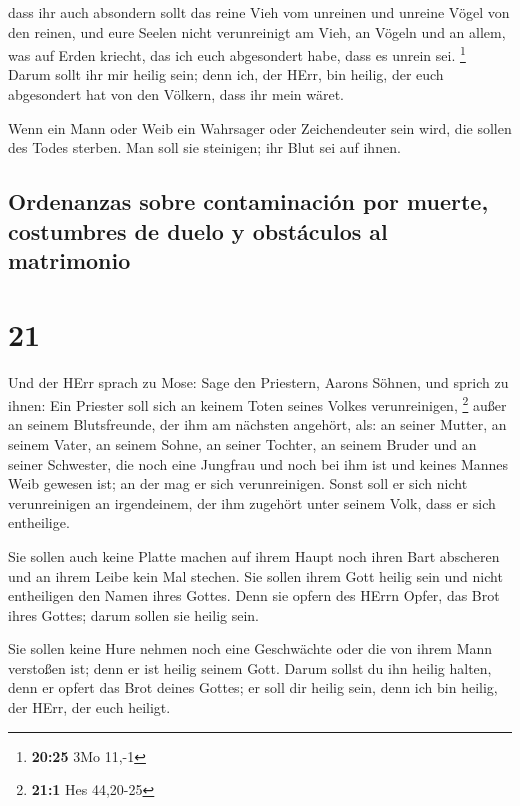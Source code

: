  dass ihr auch absondern sollt das reine Vieh vom
unreinen und unreine Vögel von den reinen, und eure Seelen nicht
verunreinigt am Vieh, an Vögeln und an allem, was auf Erden kriecht, das
ich euch abgesondert habe, dass es unrein sei. \footnote{\textbf{20:25}
  3Mo 11,-1}  Darum sollt ihr mir heilig sein; denn ich,
der HErr, bin heilig, der euch abgesondert hat von den Völkern, dass ihr
mein wäret.

 Wenn ein Mann oder Weib ein Wahrsager oder Zeichendeuter
sein wird, die sollen des Todes sterben. Man soll sie steinigen; ihr
Blut sei auf ihnen.

\hypertarget{ordenanzas-sobre-contaminaciuxf3n-por-muerte-costumbres-de-duelo-y-obstuxe1culos-al-matrimonio}{%
\subsection{Ordenanzas sobre contaminación por muerte, costumbres de
duelo y obstáculos al
matrimonio}\label{ordenanzas-sobre-contaminaciuxf3n-por-muerte-costumbres-de-duelo-y-obstuxe1culos-al-matrimonio}}

\hypertarget{section-20}{%
\section{21}\label{section-20}}

 Und der HErr sprach zu Mose: Sage den Priestern, Aarons
Söhnen, und sprich zu ihnen: Ein Priester soll sich an keinem Toten
seines Volkes verunreinigen, \footnote{\textbf{21:1} Hes 44,20-25}
 außer an seinem Blutsfreunde, der ihm am nächsten
angehört, als: an seiner Mutter, an seinem Vater, an seinem Sohne, an
seiner Tochter, an seinem Bruder  und an seiner Schwester,
die noch eine Jungfrau und noch bei ihm ist und keines Mannes Weib
gewesen ist; an der mag er sich verunreinigen.  Sonst soll
er sich nicht verunreinigen an irgendeinem, der ihm zugehört unter
seinem Volk, dass er sich entheilige.

 Sie sollen auch keine Platte machen auf ihrem Haupt noch
ihren Bart abscheren und an ihrem Leibe kein Mal stechen. 
Sie sollen ihrem Gott heilig sein und nicht entheiligen den Namen ihres
Gottes. Denn sie opfern des HErrn Opfer, das Brot ihres Gottes; darum
sollen sie heilig sein.

 Sie sollen keine Hure nehmen noch eine Geschwächte oder
die von ihrem Mann verstoßen ist; denn er ist heilig seinem Gott.
 Darum sollst du ihn heilig halten, denn er opfert das
Brot deines Gottes; er soll dir heilig sein, denn ich bin heilig, der
HErr, der euch heiligt.

